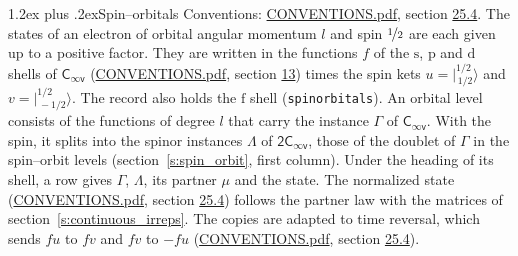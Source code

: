 \documentclass[10pt,a4paper]{article}
\makeatletter
\renewcommand\section{\@startsection{section}{1}{\z@}{-3ex plus -1ex minus -.2ex}%
  {1.2ex plus .2ex}{\normalfont\large\sffamily\bfseries\color{parttitle}}}
\numberwithin{equation}{section}
\newcommand{\grp}[1]{\mathsf{#1}}
\newcommand{\orbital}[1]{\mathrm{#1}}
\newcommand{\intx}{\mu}
\newcommand{\jm}[2]{\bigl\lvert{}^{#1}_{\,#2}\bigr\rangle}
\makeatother
\begin{document}
\section{Spin--orbitals}\label{s:spin_orbitals}
Conventions: \href{../../CONVENTIONS.pdf}{CONVENTIONS.pdf}, section \href{../../CONVENTIONS.pdf\#conv.25.4}{25.4}.
\leavevmode\label{n:index.orbital.l}The states of an electron of orbital angular momentum $l$ and spin $\nicefrac{1}{2}$ are each given up to a positive factor. \label{n:local.spinor.uv}\label{n:local.function.f}They are written in the functions $f$ of the $\orbital{s}$, $\orbital{p}$ and $\orbital{d}$ shells of \href{../../../rotation/data/pdf/Cinfv.pdf}{$\grp{C_{\infty v}}$} (\href{../../CONVENTIONS.pdf}{CONVENTIONS.pdf}, section \href{../../../rotation/CONVENTIONS.pdf\#conv.13}{13}) times the spin kets $u = \jm{1/2}{1/2}$ and $v = \jm{1/2}{-1/2}$. The record also holds the $\orbital{f}$ shell (\texttt{spinorbitals}). An orbital level consists of the functions of degree $l$ that carry the instance $\Gamma$ of \href{../../../rotation/data/pdf/Cinfv.pdf}{$\grp{C_{\infty v}}$}. With the spin, it splits into the spinor instances $\Lambda$ of $\grp{2C_{\infty v}}$, those of the doublet of $\Gamma$ in the spin--orbit levels (section~\ref{s:spin_orbit}, first column). \label{n:head.state}Under the heading of its shell, a row gives $\Gamma$, $\Lambda$, its partner $\intx$ and the state. The normalized state (\href{../../CONVENTIONS.pdf}{CONVENTIONS.pdf}, section \href{../../CONVENTIONS.pdf\#conv.25.4}{25.4}) follows the partner law with the matrices of section~\ref{s:continuous_irreps}. The copies are adapted to time reversal, which sends $f u$ to $f v$ and $f v$ to $-f u$ (\href{../../CONVENTIONS.pdf}{CONVENTIONS.pdf}, section \href{../../CONVENTIONS.pdf\#conv.25.4}{25.4}).
\end{document}
